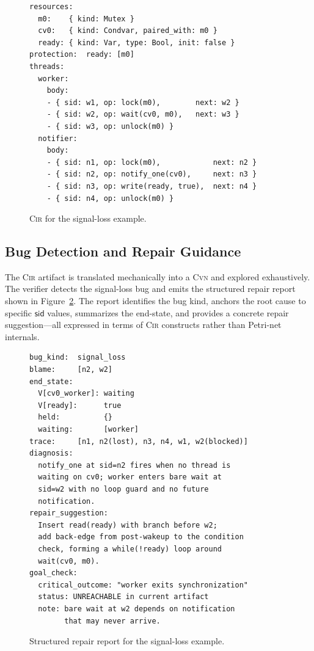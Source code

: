 \documentclass[sigconf]{acmart}
\begin{document}
\begin{figure}[t]
\begin{lstlisting}[basicstyle=\small\ttfamily, frame=single]
resources:
  m0:    { kind: Mutex }
  cv0:   { kind: Condvar, paired_with: m0 }
  ready: { kind: Var, type: Bool, init: false }
protection:  ready: [m0]
threads:
  worker:
    body:
    - { sid: w1, op: lock(m0),        next: w2 }
    - { sid: w2, op: wait(cv0, m0),   next: w3 }
    - { sid: w3, op: unlock(m0) }
  notifier:
    body:
    - { sid: n1, op: lock(m0),            next: n2 }
    - { sid: n2, op: notify_one(cv0),     next: n3 }
    - { sid: n3, op: write(ready, true),  next: n4 }
    - { sid: n4, op: unlock(m0) }
\end{lstlisting}
\caption{\textsc{Cir} for the signal-loss example.}
\label{fig:cir-a}
\end{figure}

\subsection{Bug Detection and Repair Guidance}
\label{subsec:repair-demo}


The \textsc{Cir} artifact is translated mechanically into a \textsc{Cvn} and explored exhaustively. The verifier detects the signal-loss bug and emits the structured repair report shown in Figure~\ref{fig:repair-report}. The report identifies the bug kind, anchors the root cause to specific $\mathsf{sid}$ values, summarizes the end-state, and provides a concrete repair suggestion---all expressed in terms of \textsc{Cir} constructs rather than Petri-net internals.

\begin{figure}[t]
\begin{lstlisting}[basicstyle=\small\ttfamily, frame=single]
bug_kind:  signal_loss
blame:     [n2, w2]
end_state:
  V[cv0_worker]: waiting
  V[ready]:      true
  held:          {}
  waiting:       [worker]
trace:     [n1, n2(lost), n3, n4, w1, w2(blocked)]
diagnosis:
  notify_one at sid=n2 fires when no thread is
  waiting on cv0; worker enters bare wait at
  sid=w2 with no loop guard and no future
  notification.
repair_suggestion:
  Insert read(ready) with branch before w2;
  add back-edge from post-wakeup to the condition
  check, forming a while(!ready) loop around
  wait(cv0, m0).
goal_check:
  critical_outcome: "worker exits synchronization"
  status: UNREACHABLE in current artifact
  note: bare wait at w2 depends on notification
        that may never arrive.
\end{lstlisting}
\caption{Structured repair report for the signal-loss example.}
\label{fig:repair-report}
\end{figure}
\end{document}
